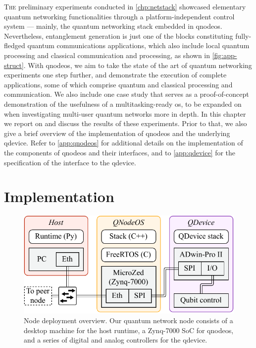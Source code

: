 \lettrine{T}{he} preliminary experiments conducted in \cref{chp:netstack} showcased elementary
quantum networking functionalities through a platform-independent control system --- mainly, the
quantum networking stack embedded in \acrshort{qnodeos}. Nevertheless, entanglement generation is
just one of the blocks constituting fully-fledged quantum communications applications, which also
include local quantum processing and classical communication and processing, as shown in
\cref{fig:app-struct}. With \acrshort{qnodeos}, we aim to take the state of the art of quantum
networking experiments one step further, and demonstrate the execution of complete applications,
some of which comprise quantum and classical processing and communication. We also include one case
study that serves as a proof-of-concept demonstration of the usefulness of a multitasking-ready
\acrshort{os}, to be expanded on when investigating multi-user quantum networks more in depth. In
this chapter we report on and discuss the results of these experiments. Prior to that, we also give
a brief overview of the implementation of \acrshort{qnodeos} and the underlying \acrshort{qdevice}.
Refer to \cref{app:qnodeos} for additional details on the implementation of the components of
\acrshort{qnodeos} and their interfaces, and to \cref{app:qdevice} for the specification of the
interface to the \acrshort{qdevice}.

\section{Implementation}
\label{sec:qnodeos:implementation}

\begin{figure}[b]
    \centering
    \includegraphics[width=0.6\linewidth]{figures/node-deployment.pdf}
    \caption{
        Node deployment overview. Our quantum network node consists of a desktop machine for the
        host runtime, a Zynq-7000 SoC for \acrshort{qnodeos}, and a series of digital and analog
        controllers for the \acrshort{qdevice}.
    }
    \label{fig:node-deployment}
\end{figure}


